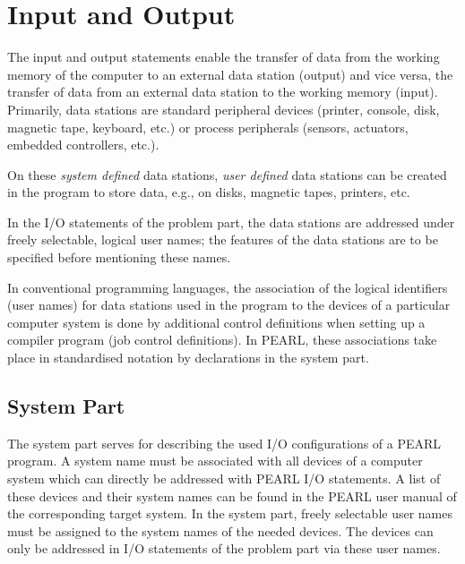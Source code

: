 \chapter{Input and Output}   %
\label{sec_input_output}
The input and output statements enable the transfer of data from the
working memory of the computer to an external data station (output) and
vice versa, the transfer of data from an external data station to the
working memory (input). Primarily, data stations are standard peripheral
devices (printer, console, disk, magnetic tape, keyboard, etc.) or
process peripherals (sensors, actuators, embedded controllers, etc.).

On these {\em system defined} data stations, {\em user defined} data
stations can be created in the program to store data, e.g., on disks,
magnetic tapes, printers, etc.

In the I/O statements of the problem part, the data stations are
addressed under freely selectable, logical user names; the features of
the data stations are to be specified before mentioning these names.

In conventional programming languages, the association of the logical
identifiers (user names) for data stations used in the program to the
devices of a particular computer system is done by additional control
definitions when setting up a compiler program (job control
definitions). In PEARL, these associations take place in standardised
notation by declarations in the system part.

\section{System Part}    %
\label{dation_system_part}

The system part serves for describing the used I/O configurations of a
PEARL program. A system name must be associated with all devices of a
computer system which can directly be addressed with PEARL I/O
statements. A list of these devices and their system names can be
found in the PEARL user manual of the corresponding target system. In
the system part, freely selectable user names must be assigned to the
system names of the needed devices. The devices can only be addressed in
I/O statements of the problem part via these user names. 

